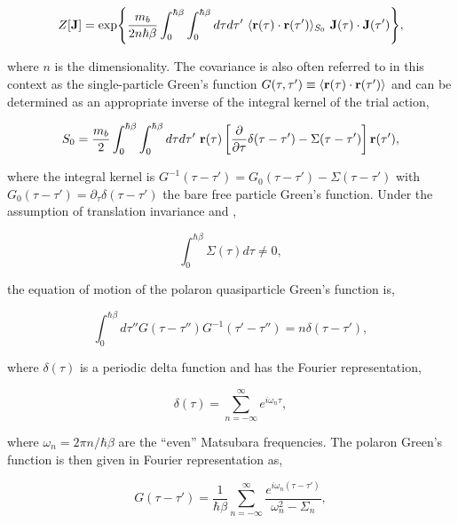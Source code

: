 \begin{equation}
    Z[\vb{J}] = \exp{\frac{m_b}{2n \hbar \beta} \int_0^{\hbar\beta} \int_0^{\hbar\beta} d\tau d\tau'\ \langle \vb{r}(\tau) \cdot \vb{r}(\tau') \rangle_{S_0}\ \vb{J}(\tau) \cdot \vb{J}(\tau')},
\end{equation}

where $n$ is the dimensionality. The covariance is also often referred to in this context as the single-particle Green's function $G(\tau, \tau') \equiv \langle \vb{r}(\tau) \cdot \vb{r}(\tau') \rangle$ and can be determined as an appropriate inverse of the integral kernel of the trial action,

\begin{equation}
    S_0 = \frac{m_b}{2}\int_0^{\hbar\beta} \int_0^{\hbar\beta} d\tau d\tau'\ \vb{r}(\tau) \left[ \frac{\partial}{\partial \tau} \delta(\tau - \tau') - \Sigma(\tau - \tau') \right] \vb{r}(\tau'),
\end{equation}

where the integral kernel is $G^{-1}(\tau - \tau') = G_0(\tau - \tau') - \Sigma(\tau - \tau')$ with $G_0(\tau - \tau') = \partial_{\tau}\delta(\tau - \tau')$ the bare free particle Green's function. Under the assumption of translation invariance and ,

\begin{equation}
    \int_0^{\hbar\beta} \Sigma(\tau) d\tau \neq 0,
\end{equation}

the equation of motion of the polaron quasiparticle Green's function is,

\begin{equation}
    \int_0^{\hbar\beta} d\tau'' G(\tau - \tau'') G^{-1}(\tau' - \tau'') = n \delta(\tau - \tau'),
\end{equation}

where $\delta(\tau)$ is a periodic delta function and has the Fourier representation,

\begin{equation}
    \delta(\tau) = \sum_{n=-\infty}^{\infty} e^{i \omega_n \tau},
\end{equation}

where $\omega_n = 2\pi n / \hbar \beta$ are the ``even'' Matsubara frequencies. The polaron Green's function is then given in Fourier representation as,

\begin{equation}
    G(\tau - \tau') = \frac{1}{\hbar\beta} \sum_{n=-\infty}^{\infty} \frac{e^{i\omega_n \left( \tau - \tau' \right)}}{\omega^2_n - \Sigma_n},
\end{equation}

